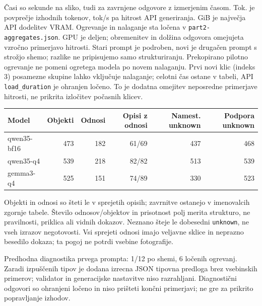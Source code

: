 \documentclass[10pt,a4paper]{article}
\begin{document}
Časi so sekunde na sliko, tudi za zavrnjene odgovore z izmerjenim časom. Tok. je povprečje izhodnih tokenov, tok/s pa hitrost API generiranja. GiB je največja API dodelitev VRAM. Ogrevanje in nalaganje sta ločena v \texttt{part2-aggregates.json}. GPU je deljen; obremenitev in dolžina odgovora omejujeta vzročno primerjavo hitrosti. Stari prompt je podroben, novi je drugačen prompt s strožjo shemo; razlike ne pripisujemo samo strukturiranju.
Prekopirano pilotno ogrevanje ne pomeni ogretega modela po novem nalaganju. Prvi novi klic (indeks 3) posamezne skupine lahko vključuje nalaganje; celotni čas ostane v tabeli, API \texttt{load\_duration} je ohranjen ločeno. To je dodatna omejitev neposredne primerjave hitrosti, ne prikrita izločitev počasnih klicev.
\begin{center}\small\begin{tabular}{lrrrrr}\toprule
Model & Objekti & Odnosi & Opisi z odnosi & Namest. unknown & Podpora unknown \\ \midrule
qwen35-bf16 & 473 & 182 & 61/69 & 437 & 468 \\
qwen35-q4 & 539 & 218 & 82/82 & 513 & 539 \\
gemma3-q4 & 525 & 151 & 74/89 & 330 & 523 \\
\bottomrule\end{tabular}\end{center}

Objekti in odnosi so šteti le v sprejetih opisih; zavrnitve ostanejo v imenovalcih zgornje tabele. Število odnosov/objektov in prisotnost polj merita strukturo, ne pravilnosti, priklica ali vidnih dokazov. Neznano šteje le dobesedni \texttt{unknown}, ne vseh izrazov negotovosti. Vsi sprejeti odnosi imajo veljavne sklice in neprazno besedilo dokaza; ta pogoj ne potrdi vsebine fotografije.

Predhodna diagnostika prvega prompta: 1/12 po shemi, 6 ločenih ogrevanj. Zaradi izpuščenih tipov je dodana izrecna JSON tipovna predloga brez vsebinskih primerov; validator in generacijske nastavitve niso razrahljani. Diagnostični odgovori so ohranjeni ločeno in niso prišteti končni primerjavi; ne gre za prikrito popravljanje izhodov.

\newpage
\end{document}
